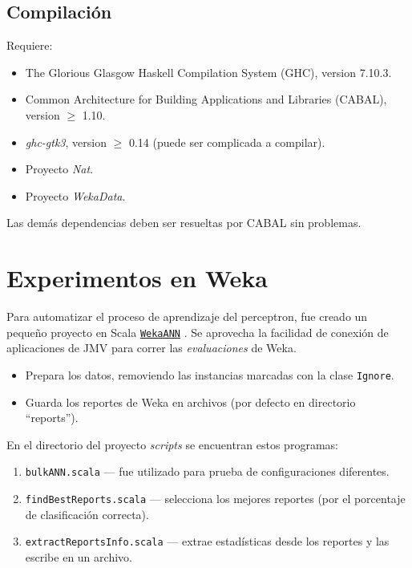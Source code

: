 \documentclass{article}
\newcommand\refcode[2]{ \href{#1}{\texttt{#2}} }
\begin{document}
\subsection{Compilación}

Requiere:
\begin{itemize}
    \item The Glorious Glasgow Haskell Compilation System (GHC), version 7.10.3.
    \item Common Architecture for Building Applications and Libraries (CABAL),
          version $\geq$ 1.10.
    \item \emph{ghc-gtk3}, version $\geq$ 0.14 (puede ser complicada a compilar).
    \item Proyecto \emph{Nat}.
    \item Proyecto \emph{WekaData}.
\end{itemize}

Las demás dependencias deben ser resueltas por CABAL sin problemas.

\section{Experimentos en Weka}

Para automatizar el proceso de aprendizaje del perceptron, fue creado un pequeño proyecto en Scala \refcode{\WekaANN}{WekaANN}. Se aprovecha la facilidad de conexión de aplicaciones de JMV para correr las \emph{evaluaciones} de Weka.

\begin{itemize}
\item Prepara los datos, removiendo las instancias marcadas con la clase 
    \verb|Ignore|.
\item Guarda los reportes de Weka en archivos (por defecto en directorio ``reports'').
\end{itemize}

\medskip
En el directorio del proyecto \emph{scripts} se encuentran estos programas:
\begin{enumerate}
\item \verb|bulkANN.scala| --- fue utilizado para prueba de configuraciones diferentes.
\item \verb|findBestReports.scala| --- selecciona los mejores reportes (por el porcentaje de clasificación correcta).
\item \verb|extractReportsInfo.scala| --- extrae estadísticas desde los reportes y las escribe en un archivo.
\end{enumerate}
\end{document}
